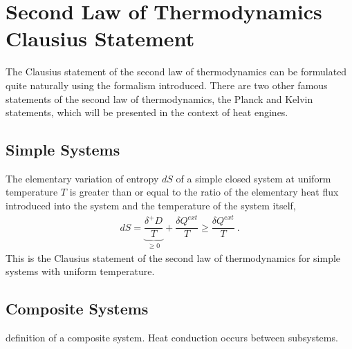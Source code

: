 \documentclass[letterpaper,10pt,english]{jupyterBook}
\begin{document}
\sphinxstepscope


\section{Second Law of Thermodynamics \sphinxhyphen{} Clausius Statement}
\label{\detokenize{ch/principles-second:second-law-of-thermodynamics-clausius-statement}}\label{\detokenize{ch/principles-second:physics-hs-thermodynamics-foundation-principles-second}}\label{\detokenize{ch/principles-second::doc}}
\sphinxAtStartPar
The Clausius statement of the second law of thermodynamics can be formulated quite naturally using the formalism introduced. There are two other famous statements of the second law of thermodynamics, the Planck and Kelvin statements, which will be presented in the context of heat engines.


\subsection{Simple Systems}
\label{\detokenize{ch/principles-second:simple-systems}}\label{\detokenize{ch/principles-second:physics-hs-thermodynamics-foundation-principles-second-simple}}
\sphinxAtStartPar
The elementary variation of entropy \(d S\) of a simple closed system at uniform temperature \(T\) is greater than or equal to the ratio of the elementary heat flux introduced into the system and the temperature of the system itself,
\begin{equation*}
\begin{split}dS = \underbrace{\dfrac{\delta^+ D}{T}}_{\ge 0} + \dfrac{\delta Q^{ext}}{T} \ge \dfrac{\delta Q^{ext}}{T} \ .\end{split}
\end{equation*}
\sphinxAtStartPar
This is the Clausius statement of the second law of thermodynamics for simple systems with uniform temperature.


\subsection{Composite Systems}
\label{\detokenize{ch/principles-second:composite-systems}}\label{\detokenize{ch/principles-second:physics-hs-thermodynamics-principles-second-composite}}
\sphinxAtStartPar
{} definition of a composite system. Heat conduction occurs between subsystems.
\end{document}
